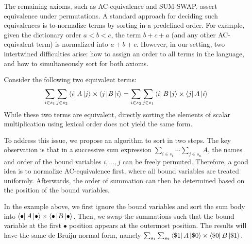 The remaining axioms, such as AC-equivalence and SUM-SWAP, assert equivalence under permutations. A standard approach for deciding such equivalences is to normalize terms by sorting in a predefined order. For example, given the dictionary order \( a < b < c \), the term \( b + c + a \) (and any other AC-equivalent term) is normalized into \( a + b + c \). However, in our setting, two intertwined difficulties arise: how to assign an order to all terms in the language, and how to simultaneously sort for both axioms.

Consider the following two equivalent terms:
\[
\sum_{i \in s_1} \sum_{j \in s_2} \bra{i} A \ket{j} \times \bra{j} B \ket{i}
= 
\sum_{i \in s_2} \sum_{j \in s_1} \bra{i} B \ket{j} \times \bra{j} A \ket{i}
\]
While these two terms are equivalent, directly sorting the elements of scalar multiplication using lexical order does not yield the same form.

To address this issue, we propose an algorithm to sort in two steps. The key observation is that in a successive sum expression \( \sum_{i \in s_1} \cdots \sum_{j \in s_n} A \), the names and order of the bound variables \( i, \dots, j \) can be freely permuted. Therefore, a good idea is to normalize AC-equivalence first, where all bound variables are treated uniformly. Afterwards, the order of summation can then be determined based on the position of the bound variables.


In the example above, we first ignore the bound variables and sort the sum body into \( \bra{\bullet} A \ket{\bullet} \times \bra{\bullet} B \ket{\bullet} \). Then, we swap the summations such that the bound variable at the first \( \bullet \) position appears at the outermost position. The results will have the same de Bruijn normal form, namely \( \sum_{s_1} \sum_{s_2} \bra{\$1} A \ket{\$0} \times \bra{\$0} B \ket{\$1} \).


